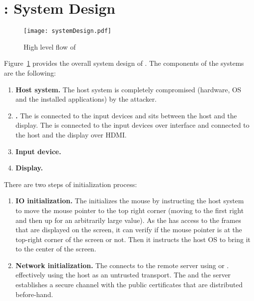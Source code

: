 \section{\name: System Design}
\label{sec:systemDesign}


\begin{figure}[t]
\centering
\texttt{[image: systemDesign.pdf]}
\caption{High level flow of \name}
\label{fig:systemDesign}
\centering
\end{figure}


Figure~\ref{fig:systemDesign} provides the overall system design of \name. The components of the systems are the following:

\begin{enumerate}
  \item \textbf{Host system.} The host system is completely compromised (hardware, OS and the installed applications) by the attacker.
  \item \textbf{\device.} The \device is connected to the input devices and sits between the host and the display. The \device is connected to the input devices over \usb interface and connected to the host and the display over HDMI.
  \item \textbf{Input device.}
  \item \textbf{Display.}
  
\end{enumerate}

There are two steps of initialization process:

\begin{enumerate}
  \item\textbf{IO initialization.} The \device initializes the mouse by instructing the host system to move the mouse pointer to the top right corner (moving to the first right and then up for an arbitrarily large value). As the \device has access to the frames that are displayed on the screen, it can verify if the mouse pointer is at the top-right corner of the screen or not. Then it instructs the host OS to bring it to the center of the screen.
  
  \item\textbf{Network initialization.} The \device connects to the remote server using \webusb or \webbt. effectively using the host as an untrusted transport. The \device and the server establishes a secure channel with the public certificates that are distributed before-hand.
\end{enumerate}

